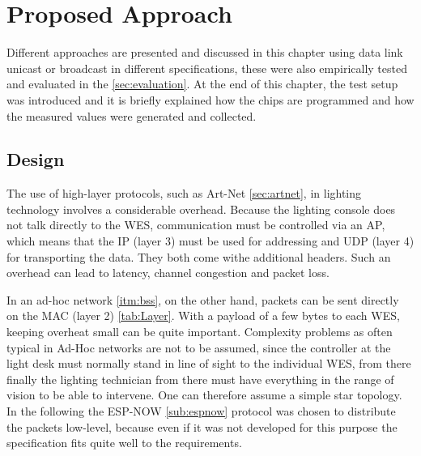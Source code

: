 \chapter{Proposed Approach}


Different approaches are presented and discussed in this chapter using data link unicast or broadcast in different specifications,
these were also empirically tested and evaluated in the \cref{sec:evaluation}.
At the end of this chapter, the test setup was introduced and 
it is briefly explained how the chips are programmed and how the measured values were generated and collected.

\section{Design}

The use of high-layer protocols, such as Art-Net \cref{sec:artnet}, in lighting technology involves a considerable overhead. 
Because the lighting console does not talk directly to the \ac{WES}, communication must be controlled via an \ac{AP}, 
which means that the \ac{IP} (layer 3) must be used for addressing and \ac{UDP} (layer 4) for transporting the data. 
They both come withe additional headers. 
Such an overhead can lead to latency, channel congestion and packet loss.
 
In an ad-hoc network \cref{itm:bss}, on the other hand, packets can be sent directly on the MAC (layer 2) \cref{tab:Layer}. 
With a payload of a few bytes to each WES, keeping overheat small can be quite important. 
Complexity problems as often typical in Ad-Hoc networks are not to be assumed, 
since the controller at the light desk must normally stand in line of sight to the individual WES, 
from there finally the lighting technician from there must have everything in the range of vision to be able to intervene. 
One can therefore assume a simple star topology.
In the following the ESP-NOW \cref{sub:espnow} protocol was chosen to distribute the packets low-level, 
because even if it was not developed for this purpose the specification fits quite well to the requirements.


